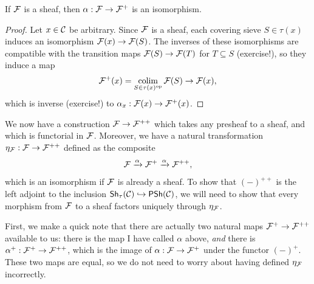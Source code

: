 \begin{proposition}\label{prop:chap:sheaves:sec:sites:plus construction of a sheaf is an isomorphism}
    If $\cal{F}$ is a sheaf, then $\alpha : \cal{F} \to \cal{F}^+$ is an isomorphism.
\end{proposition}
\begin{proof}
    Let $x \in \catC$ be arbitrary. Since $\cal{F}$ is a sheaf, each covering sieve $S \in \tau(x)$ induces an isomorphism $\cal{F}(x) \to \cal{F}(S)$. The inverses of these isomorphisms are compatible with the transition maps $\cal{F}(S) \to \cal{F}(T)$ for $T \subseteq S$ (exercise!), so they induce a map
    \[\cal{F}^+(x) = \colim_{S \in \tau(x)^\op} \cal{F}(S) \to \cal{F}(x),\]
    which is inverse (exercise!) to $\alpha_x : \cal{F}(x) \to \cal{F}^+(x)$.
\end{proof}

We now have a construction $\cal{F} \to \cal{F}^{++}$ which takes any presheaf to a sheaf, and which is functorial in $\cal{F}$. Moreover, we have a natural transformation $\eta_{\cal{F}} : \cal{F} \to \cal{F}^{++}$ defined as the composite
\[\cal{F} \xrightarrow{\alpha} \cal{F}^+ \xrightarrow{\alpha} \cal{F}^{++},\]
which is an isomorphism if $\cal{F}$ is already a sheaf. To show that ${(-)}^{++}$ is the left adjoint to the inclusion $\Sh_{\tau}(\catC) \hookrightarrow \PSh(\catC)$, we will need to show that every morphism from $\cal{F}$ to a sheaf factors uniquely through $\eta_{\cal{F}}$.

\startlecture[Oct 20, 2026]

First, we make a quick note that there are actually two natural maps $\cal{F}^+ \to \cal{F}^{++}$ available to us: there is the map I have called $\alpha$ above, \emph{and} there is $\alpha^+ : \cal{F}^+ \to \cal{F}^{++}$, which is the image of $\alpha : \cal{F} \to \cal{F}^+$ under the functor $(-)^+$. These two maps are equal, so we do not need to worry about having defined $\eta_{\cal{F}}$ incorrectly.

